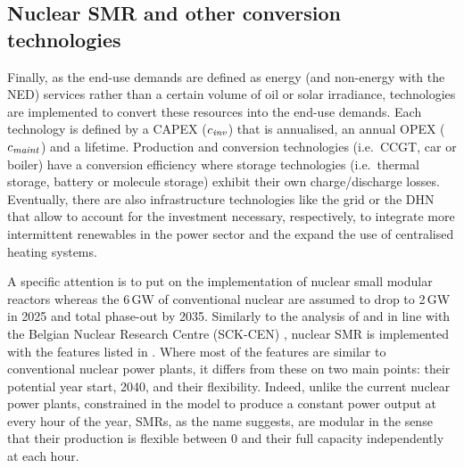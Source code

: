 \documentclass[11pt,twoside,a4paper,english]{article}
\def\ie{i.e.\ }
\begin{document}
\subsection{Nuclear SMR and other conversion technologies}
\label{subsec:cs:technologies}
Finally, as the end-use demands are defined as energy (and non-energy with the \gls{NED}) services rather than a certain volume of oil or solar irradiance, technologies are implemented to convert these resources into the end-use demands. Each technology is defined by a CAPEX ($c_{\text{\emph{inv}}}$) that is annualised, an annual OPEX ($c_{\text{\emph{maint}}}$) and a lifetime. Production and conversion technologies (\ie \gls{CCGT}, car or boiler) have a conversion efficiency where storage technologies (\ie thermal storage, battery or molecule storage) exhibit their own charge/discharge losses. Eventually, there are also infrastructure technologies like the grid or the \gls{DHN} that allow to account for the investment necessary, respectively, to integrate more intermittent renewables in the power sector and the expand the use of centralised heating systems.

A specific attention is to put on the implementation of nuclear small modular reactors whereas the 6\,GW of conventional nuclear are assumed to drop to 2\,GW in 2025 and total phase-out by 2035. Similarly to the analysis of \citet{PATHS2050} and in line with the Belgian Nuclear Research Centre (SCK-CEN) \cite{SCK-CEN_SMR}, nuclear SMR is implemented with the features listed in . Where most of the features are similar to conventional nuclear power plants, it differs from these on two main points: their potential year start, 2040, and their flexibility. Indeed, unlike the current nuclear power plants, constrained in the model to produce a constant power output at every hour of the year, SMRs, as the name suggests, are modular in the sense that their production is flexible between 0 and their full capacity independently at each hour.
\end{document}
